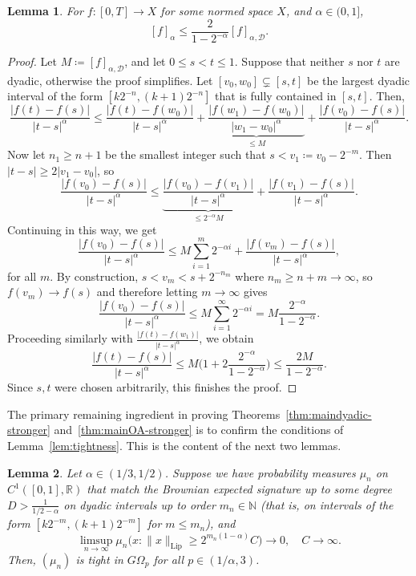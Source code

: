 \documentclass[11pt, letterpaper]{article}
\newtheorem{lemma}{Lemma}
\theoremstyle{definition}
\theoremstyle{remark}
\newcommand{\R}{\mathbb{R}}
\newcommand{\N}{\mathbb{N}}
\begin{document}
\begin{appendices}
\begin{lemma}\label{lem: holder dyadic}
    For $f\colon [0,T] \to X$ for some normed space $X$, and $\alpha \in (0,1]$, \[
    [f]_\alpha \le \frac{2}{1-2^{-\alpha}} [f]_{\alpha,\mathcal{D}}.
    \]
\end{lemma}
\begin{proof}
    Let $M \coloneqq [f]_{\alpha,\mathcal{D}}$, and let $0 \le s < t \le 1$. Suppose that neither $s$ nor $t$ are dyadic, otherwise the proof simplifies. Let $[v_0,w_0] \subsetneq [s,t]$ be the largest dyadic interval of the form $[k2^{-n},(k+1)2^{-n}]$ that is fully contained in $[s,t]$. Then, \[
    \frac{|f(t)-f(s)|}{|t-s|^\alpha} \le \frac{|f(t)-f(w_0)|}{|t-s|^\alpha} + \underbrace{\frac{|f(w_1) - f(w_0)|}{|w_1-w_0|^\alpha}}_{\le M} + \frac{|f(v_0)-f(s)|}{|t-s|^\alpha}.
    \] Now let $n_1 \ge n+1$ be the smallest integer such that $s < v_1\coloneqq v_0 - 2^{-m}$. Then $|t-s| \ge 2 |v_1-v_0|$, so \[
    \frac{|f(v_0)-f(s)|}{|t-s|^\alpha} \le \underbrace{\frac{|f(v_0) - f(v_1)|}{|t-s|^\alpha}}_{\le 2^{-\alpha}M} + \frac{|f(v_1) - f(s)|}{|t-s|^\alpha}.
    \] Continuing in this way, we get \[
    \frac{|f(v_0)-f(s)|}{|t-s|^\alpha} \le M \sum_{i=1}^m 2^{-\alpha i} + \frac{|f(v_m) - f(s)|}{|t-s|^\alpha},
    \] for all $m$. By construction, $s < v_m < s + 2^{-n_m}$ where $n_m \ge n + m \to \infty$, so $f(v_m) \to f(s)$ and therefore letting $m\to \infty$ gives \[
    \frac{|f(v_0)-f(s)|}{|t-s|^\alpha} \le M \sum_{i=1}^\infty 2^{-\alpha i} = M \frac{2^{-\alpha}}{1 - 2^{-\alpha}}.
    \] Proceeding similarly with $\frac{|f(t) - f(w_1)|}{|t-s|^\alpha}$, we obtain \[
    \frac{|f(t)-f(s)|}{|t-s|^\alpha} \le M \bigg( 1 + 2 \frac{2^{-\alpha}}{1-2^{-\alpha}}\bigg) \le \frac{2M}{1-2^{-\alpha}}.
    \] Since $s,t$ were chosen arbitrarily, this finishes the proof.
\end{proof}

The primary remaining ingredient in proving Theorems~\ref{thm:maindyadic-stronger} and~\ref{thm:mainOA-stronger} is to confirm the conditions of Lemma~\ref{lem:tightness}. This is the content of the next two lemmas.

\begin{lemma}\label{lem:tightness dyadic}
    Let $\alpha \in (1/3,1/2)$. Suppose we have probability measures $\mu_n$ on $C^1([0,1],\R)$ that match the Brownian expected signature up to some degree $D > \frac{1}{1/2-\alpha}$ on dyadic intervals up to order $m_n\in \N$ (that is, on intervals of the form $[k2^{-m}, (k+1)2^{-m}]$ for $m \le m_n$), and 
    \begin{equation}\label{eq:lip condition}
    \limsup_{n\to \infty} \mu_n\Big( x\colon \|x\|_\text{Lip} \ge 2^{m_n(1-\alpha)} C\Big) \longrightarrow 0,\quad C \to \infty.
    \end{equation}
     Then, $(\mu_n)$ is tight in $G\Omega_p$ for all $p \in (1/\alpha, 3)$.
     

\end{lemma}
\end{appendices}
\end{document}
